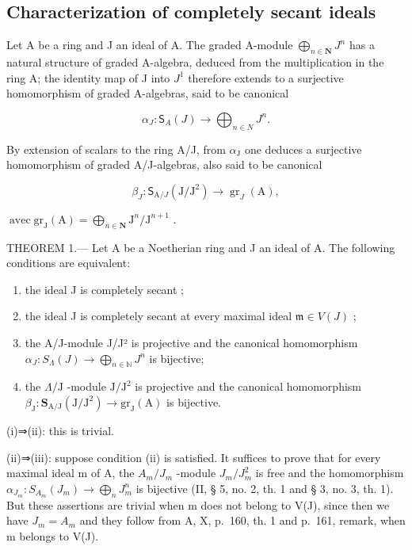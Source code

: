 \subsection{Characterization of completely secant ideals}

Let A be a ring and J an ideal of A. The graded A-module \(\bigoplus_{n\in\mathbf{N}}J^{n}\) has a natural structure of graded A-algebra, deduced from the multiplication in the ring A; the identity map of J into \(J^{1}\) therefore extends to a surjective homomorphism of graded A-algebras, said to be canonical

\[
\alpha_ {J}: \mathsf {S} _ {A} (J) \longrightarrow \bigoplus_ {n \in N} J ^ {n}.
\]

By extension of scalars to the ring A/J, from \(\alpha_{\mathrm{J}}\) one deduces a surjective homomorphism of graded A/J-algebras, also said to be canonical

\[
\beta_ {J}: \mathsf {S} _ {\mathrm{A} / J} (\mathrm{J} / \mathrm{J} ^ {2}) \longrightarrow \operatorname{gr} _ {J} (\mathrm{A}),
\]

\(\operatorname{avec} \mathrm{gr}_{\mathrm{J}}(\mathrm{A}) = \bigoplus_{n \in \mathbf{N}} \mathrm{J}^n / \mathrm{J}^{n+1}\) .

THEOREM 1.--- Let A be a Noetherian ring and J an ideal of A. The following conditions are equivalent:

\begin{enumerate}
\def\labelenumi{(\roman{enumi})}
\item
  the ideal J is completely secant ;
\item
  the ideal J is completely secant at every maximal ideal \(\mathfrak{m} \in V(J)\) ;
\item
  the A/J-module J/J² is projective and the canonical homomorphism \(\alpha_{J}: S_{\Lambda}(J) \longrightarrow \bigoplus_{n \in \mathbb{N}} J^{n}\) is bijective;
\item
  the \(\Lambda/\mathrm{J}\) -module \(\mathrm{J}/\mathrm{J}^2\) is projective and the canonical homomorphism \(\beta_{\mathrm{J}}:\mathbf{S}_{\mathrm{A}/\mathrm{J}}(\mathrm{J}/\mathrm{J}^2)\longrightarrow\mathrm{gr}_{\mathrm{J}}(\mathrm{A})\) is bijective.
\end{enumerate}

(i)⇒(ii): this is trivial.

(ii)⇒(iii): suppose condition (ii) is satisfied. It suffices to prove that for every maximal ideal m of A, the \(A_{m}/J_{m}\) -module \(J_{m}/J_{m}^{2}\) is free and the homomorphism \(\alpha_{J_{m}}: S_{A_{m}}(J_{m}) \longrightarrow \bigoplus_{n} J_{m}^{n}\) is bijective (II, § 5, no. 2, th. 1 and § 3, no. 3, th. 1). But these assertions are trivial when m does not belong to V(J), since then we have \(J_{m} = A_{m}\) and they follow from A, X, p.~160, th. 1 and p.~161, remark, when m belongs to V(J).

